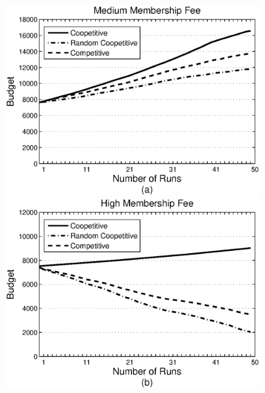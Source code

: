 \documentclass[runningheads,a4paper]{llncs}
\begin{document}

\begin{figure}%
\centering
\includegraphics[scale=0.275]{graphbgtmed3set.eps}
\includegraphics[scale=0.275]{graphbgthigh.eps}

\end{figure}
\end{document}
